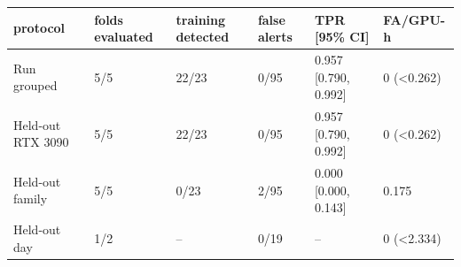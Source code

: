 \begin{tabular}{llllll}
\toprule
protocol & folds evaluated & training detected & false alerts & TPR [95\% CI] & FA/GPU-h \\
\midrule
Run grouped & 5/5 & 22/23 & 0/95 & 0.957 [0.790, 0.992] & 0 (<0.262) \\
Held-out RTX 3090 & 5/5 & 22/23 & 0/95 & 0.957 [0.790, 0.992] & 0 (<0.262) \\
Held-out family & 5/5 & 0/23 & 2/95 & 0.000 [0.000, 0.143] & 0.175 \\
Held-out day & 1/2 & -- & 0/19 & -- & 0 (<2.334) \\
\bottomrule
\end{tabular}
